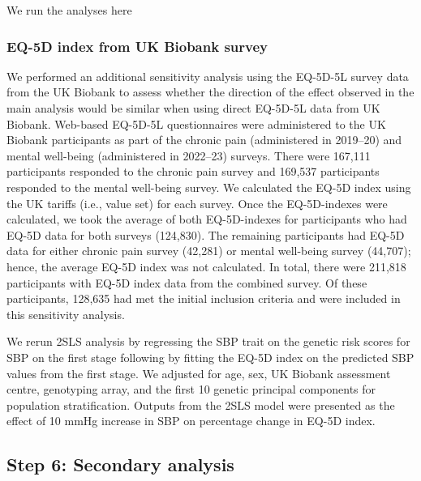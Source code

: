 \documentclass[11pt]{article}
\begin{document}
We run the analyses here
\color{violet}
\begin{stlog}\end{stlog}
\color{black}
\newpage
\subsubsection{EQ-5D index from UK Biobank survey}

We performed an additional sensitivity analysis using the EQ-5D-5L survey data from the UK Biobank\cite{ukb2022pain, ukb2023mental} to assess whether the direction of the effect observed in the main analysis would be similar when using direct EQ-5D-5L data from UK Biobank. Web-based EQ-5D-5L questionnaires were administered to the UK Biobank participants as part of the chronic pain (administered in 2019--20) and mental well-being (administered in 2022--23) surveys\cite{ukb2022pain, ukb2023mental}. There were 167,111 participants responded to the chronic pain survey\cite{ukb2022pain} and 169,537 participants responded to the mental well-being survey\cite{ukb2023mental}. We calculated the EQ-5D index using the UK tariffs (i.e., value set) for each survey\cite{devlin2018valuing}. Once the EQ-5D-indexes were calculated, we took the average of both EQ-5D-indexes for participants who had EQ-5D data for both surveys (124,830). The remaining participants had EQ-5D data for either chronic pain survey (42,281) or mental well-being survey (44,707); hence, the average EQ-5D index was not calculated. In total, there were 211,818 participants with EQ-5D index data from the combined survey. Of these participants, 128,635 had met the initial inclusion criteria and were included in this sensitivity analysis. 
 
We rerun 2SLS analysis by regressing the SBP trait on the genetic risk scores for SBP on the first stage following by fitting the EQ-5D index on the predicted SBP values from the first stage. We adjusted for age, sex, UK Biobank assessment centre, genotyping array, and the first 10 genetic principal components for population stratification. Outputs from the 2SLS model were presented as the effect of 10 mmHg increase in SBP on percentage change in EQ-5D index. 
\color{violet} 
\begin{stlog}\end{stlog}
\color{black}
\newpage
\subsection{Step 6: Secondary analysis}
\end{document}
